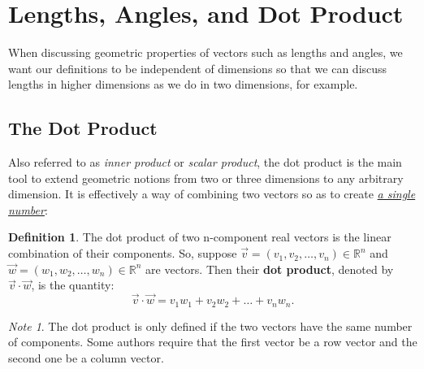 \documentclass[11pt]{amsart} %
\theoremstyle{plain}
\theoremstyle{definition}
\newtheorem*{dfn}{Definition}
\theoremstyle{definition}
\theoremstyle{remark}
\newtheorem*{note}{Note}
\theoremstyle{definition}
\begin{document}
\section{Lengths, Angles, and Dot Product}

When discussing geometric properties of vectors such as lengths and angles, we want our definitions to be independent of dimensions so that we can discuss lengths in higher dimensions as we do in two dimensions, for example.

\medskip
\subsection{The Dot Product} \hfill

Also referred to as \emph{inner product} or \emph{scalar product}, the dot product is the main tool to extend geometric notions from two or three dimensions to any arbitrary dimension. It is effectively a way of combining two vectors so as to create \underline{\emph{a single number}}:

\begin{tcolorbox}[colback=yellow!5!white]
\begin{dfn}
The dot product of two n-component real vectors is the linear combination of their components. So, suppose $\vec{v}=(v_1, v_2,\dots,v_n) \in \mathbb{R}^{n}$ and $\vec{w}=(w_1, w_2, \dots, w_n) \in \mathbb{R}^{n}$ are vectors. Then their \textbf{dot product}, denoted by $\vec{v}\cdot\vec{w}$, is the quantity:
\[ \vec{v}\cdot\vec{w}=v_1w_1+v_2w_2+\dots+v_nw_n.  \]
\end{dfn}
\end{tcolorbox}

\begin{note}
The dot product is only defined if the two vectors have the same number of components. Some authors require that the first vector be a row vector and the second one be a column vector.
\end{note}
\end{document}
